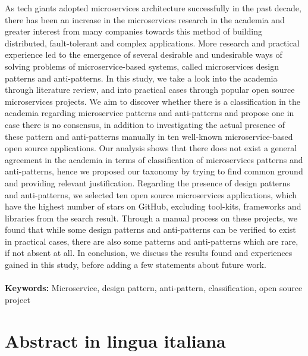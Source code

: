 \documentclass{Configuration_Files/PoliMi3i_thesis}
\begin{document}
As tech giants adopted microservices architecture successfully in the past decade, there has been an increase in the microservices research in the academia and greater interest from many companies towards this method of building distributed, fault-tolerant and complex applications.
More research and practical experience led to the emergence of several desirable and undesirable ways of solving problems of microservice-based systems, called microservices design patterns and anti-patterns.
In this study, we take a look into the academia through literature review, and into practical cases through popular open source microservices projects.
We aim to discover whether there is a classification in the academia regarding microservice patterns and anti-patterns and propose one in case there is no consensus, in addition to investigating the actual presence of these pattern and anti-patterns manually in ten well-known microservice-based open source applications.
Our analysis shows that there does not exist a general agreement in the academia in terms of classification of microservices patterns and anti-patterns, hence we proposed our taxonomy by trying to find common ground and providing relevant justification.
Regarding the presence of design patterns and anti-patterns, we selected ten open source microservices applications, which have the highest number of stars on GitHub, excluding tool-kits, frameworks and libraries from the search result.
Through a manual process on these projects, we found that while some design patterns and anti-patterns can be verified to exist in practical cases, there are also some patterns and anti-patterns which are rare, if not absent at all.
In conclusion, we discuss the results found and experiences gained in this study, before adding a few statements about future work.
\\
\\
\textbf{Keywords:} Microservice, design pattern, anti-pattern, classification, open source project %

\chapter*{Abstract in lingua italiana}
\end{document}
